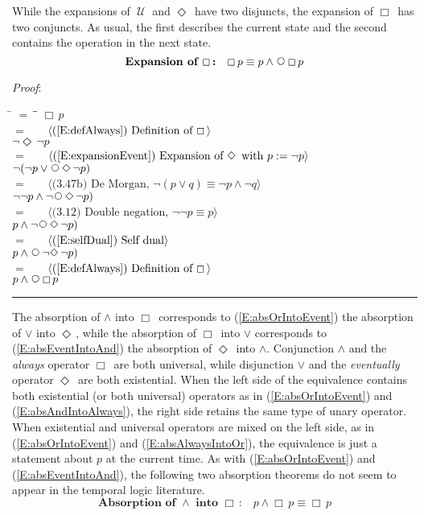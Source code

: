 \documentclass[12pt, fleqn, leqno]{article}
\newcommand{\lgap}{2pt}                             %
\newcommand{\mymathindent}{24pt}                    %
\newcommand{\Until}{\;\mathcal{U}\;}
\newcommand{\Next}{\;\,\text{\raisebox{3.5pt}{\circle{6}}}}
\newcommand{\Event}{\Diamond\,}
\newcommand{\Always}{\Box\,}
\newcommand{\myqed}{\rule[-.23ex]{1.2ex}{2.0ex}}
\newcommand{\myqedtab}{\hspace{384pt}}              %
\newcommand{\Gll} {\langle}                         %
\newcommand{\Ggg} {\rangle}                         %
\newcommand{\Hint}[1]     {\ \ \ $\Gll              \mbox{#1} \Ggg$ }   %
\begin{document}
While the expansions of $\Until$ and $\Event$ have two disjuncts,
the expansion of $\Always$ has two conjuncts.
As usual, the first describes the current state and the second contains the operation in the next state.
\begin{equation}\label{E:expansionAlways}
\textbf{Expansion of $\Always$:}\quad \Always p \equiv p \land \Next\Always p
\end{equation}

\emph{Proof}:
\begin{tabbing}
\hspace{\mymathindent} \= $= \;$ \= \myqedtab \= \kill
  \> \>   $\Always p$\\[\lgap]
  \> $=$  \>  \Hint{(\ref{E:defAlways}) Definition of $\Always$}\\[\lgap]
  \> \>   $\neg\Event\neg p$\\[\lgap]
  \> $=$  \>  \Hint{(\ref{E:expansionEvent}) Expansion of $\Event$ with $p := \neg p$}\\[\lgap]
  \> \>   $\neg(\neg p\lor\Next\Event\neg p)$\\[\lgap]
  \> $=$  \>  \Hint{(3.47b) De Morgan, $\neg (p \lor q) \equiv \neg p \land \neg q$}\\[\lgap]
  \> \>   $\neg\neg p\land\neg\Next\Event\neg p)$\\[\lgap]
  \> $=$  \>  \Hint{(3.12) Double negation, $\neg\neg p \equiv p$}\\[\lgap]
  \> \>   $p\land\neg\Next\Event\neg p)$\\[\lgap]
  \> $=$  \>  \Hint{(\ref{E:selfDual}) Self dual}\\[\lgap]
  \> \>   $p\land\Next\neg\Event\neg p)$\\[\lgap]
  \> $=$  \>  \Hint{(\ref{E:defAlways}) Definition of $\Always$}\\[\lgap]
  \> \>   $p \land \Next\Always p$ \quad \myqed
\end{tabbing}

The absorption of $\land$ into $\Always$ corresponds to (\ref{E:absOrIntoEvent}) the absorption of $\lor$ into $\Event$,
while the absorption of $\Always$ into $\lor$ corresponds to (\ref{E:absEventIntoAnd}) the absorption of $\Event$ into $\land$.
Conjunction $\land$ and the \textit{always} operator $\Always$ are both universal, while
disjunction $\lor$ and the \textit{eventually} operator $\Event$ are both existential.
When the left side of the equivalence contains both existential (or both universal) operators as in (\ref{E:absOrIntoEvent}) and (\ref{E:absAndIntoAlways}),
the right side retains the same type of unary operator.
When existential and universal operators are mixed on the left side,
as in (\ref{E:absOrIntoEvent}) and (\ref{E:absAlwaysIntoOr}), the equivalence is just a statement about $p$ at the current time.
As with (\ref{E:absOrIntoEvent}) and (\ref{E:absEventIntoAnd}), the following two absorption theorems
do not seem to appear in the temporal logic literature.
\begin{equation}\label{E:absAndIntoAlways}
\textbf{Absorption of $\land$ into $\Always$:}\quad p \land \Always p \equiv \Always p
\end{equation}
\end{document}
